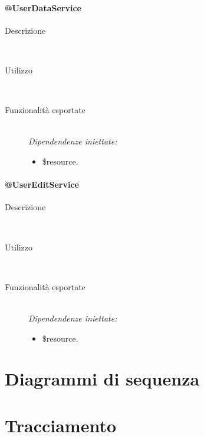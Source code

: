 \paragraph{@UserDataService}
\begin{description}
 \item[Descrizione] \hfill \\
 
 \item[Utilizzo] \hfill \\
  
 \item[Funzionalità esportate] \hfill \\
 \emph{Dipendendenze iniettate:}
 \begin{itemize}
  \item \$resource.
 \end{itemize}
\end{description}

\paragraph{@UserEditService}
\begin{description}
 \item[Descrizione] \hfill \\
 
 \item[Utilizzo] \hfill \\
  
 \item[Funzionalità esportate] \hfill \\
 \emph{Dipendendenze iniettate:}
 \begin{itemize}
  \item \$resource.
 \end{itemize}
\end{description}

\newpage
\section{Diagrammi di sequenza}


\appendix


\newpage


\section{Tracciamento}







